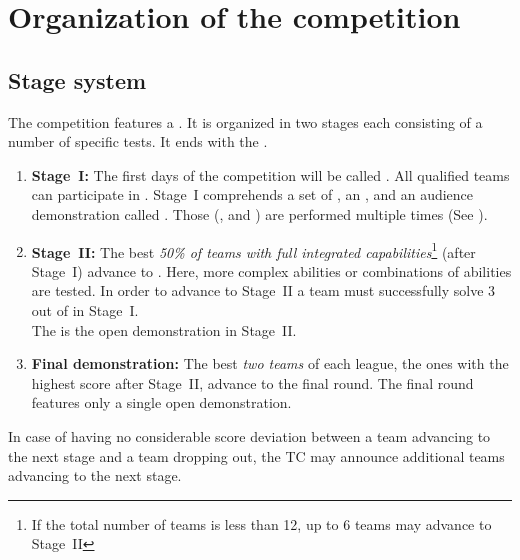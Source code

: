 \section{Organization of the competition}
\label{sec:procedure_during_competition}

\subsection{Stage system}\label{rule:stages}

The competition features a . It is organized in two stages each consisting of a number of specific tests. It ends with the .

\begin{enumerate}
	\item \textbf{Stage~I:} The first days of the competition will be called . 
	All qualified teams can participate in . Stage~I comprehends a set of , an , and an audience demonstration called . 
	Those  (, and ) are performed multiple times (See ). 

	\item \textbf{Stage~II:} The best \emph{50\% of teams with full integrated capabilities}\footnote{If the total number of teams is less than 12, up to 6 teams may advance to Stage~II} (after Stage~I) advance to . Here, more complex abilities or combinations of abilities are tested. In order to advance to Stage~II a team must successfully solve 3 out of  in Stage~I. \\
	The  is the open demonstration in Stage~II.
	\item \textbf{Final demonstration:} The best \emph{two teams} of each league, the ones with the highest score after Stage~II, advance to the final round. The final round features only a single open demonstration.
\end{enumerate}

In case of having no considerable score deviation between a team advancing to the next stage and a team dropping out, the TC may announce additional teams advancing to the next stage.


